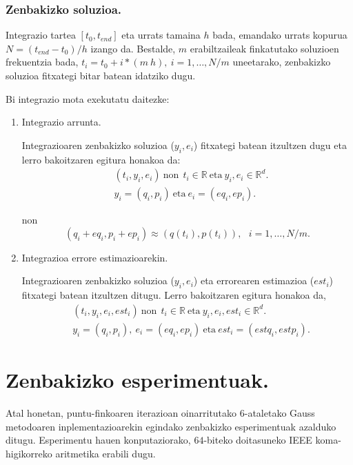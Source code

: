 \subsubsection*{Zenbakizko soluzioa.}  

Integrazio tartea $[t_0,t_{end}]$ eta urrats tamaina $h$ bada, emandako urrats kopurua $N=(t_{end}-t_0)/h$ izango da. Bestalde, $m$ erabiltzaileak finkatutako soluzioen frekuentzia bada, $t_i=t_0+i*(m \ h), \ i=1,\dots,N/m$ uneetarako, zenbakizko soluzioa fitxategi bitar batean idatziko dugu.

Bi integrazio mota exekutatu daitezke:
\begin{enumerate}
\item Integrazio arrunta.

Integrazioaren zenbakizko soluzioa ($y_i,e_i$)  fitxategi batean itzultzen dugu eta  lerro bakoitzaren egitura honakoa da:
\begin{align*}
& (t_i,y_i,e_i) \ \text{non} \ \ t_i \in \mathbb{R} \ \text{eta} \ y_i,e_i \in \mathbb{R}^d.\\
& y_i=(q_i,p_i) \ \text{eta} \ e_i=(eq_i,ep_i).
\end{align*}

non
\begin{equation*}
(q_i+eq_i,p_i+ep_i)\approx(q(t_i),p(t_i)), \ \ \ i=1,\dots,N/m.
\end{equation*}

\item Integrazioa errore estimazioarekin.

Integrazioaren zenbakizko soluzioa ($y_i,e_i$) eta errorearen estimazioa ($est_i$)  fitxategi batean itzultzen ditugu. Lerro bakoitzaren egitura honakoa da,
\begin{align*}
& (t_i,y_i,e_i,est_i) \ \text{non} \ \ t_i \in \mathbb{R} \ \text{eta} \ y_i,e_i,est_i \in \mathbb{R}^d.\\
&  y_i=(q_i,p_i), \ e_i=(eq_i,ep_i) \ \text{eta} \ est_i=(estq_i,estp_i).
\end{align*}

\end{enumerate}


\clearpage


\section{Zenbakizko esperimentuak.}

Atal honetan, puntu-finkoaren iterazioan oinarritutako $6$-ataletako Gauss metodoaren inplementazioarekin egindako zenbakizko esperimentuak azalduko ditugu. Esperimentu hauen konputaziorako, $64$-biteko doitasuneko IEEE koma-higikorreko aritmetika erabili dugu.

